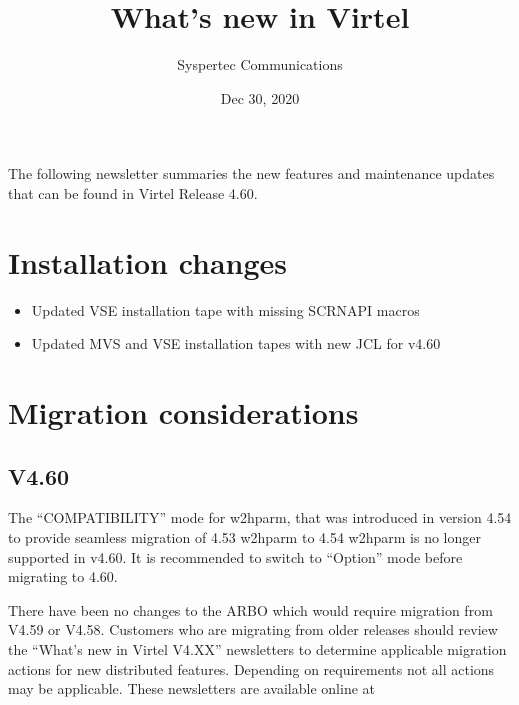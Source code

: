 \documentclass[letterpaper,10pt,english]{sphinxmanual}
\title{What's new in Virtel}
\date{Dec 30, 2020}
\author{Syspertec Communications}
\begin{document}
\pagestyle{empty}
\sphinxmaketitle
\pagestyle{plain}
\sphinxtableofcontents
\pagestyle{normal}
\label{\detokenize{TN202003::doc}}


The following newsletter summaries the new features and maintenance updates that can be found in Virtel Release 4.60.


\chapter{Installation changes}
\label{\detokenize{TN202003:installation-changes}}
\begin{itemize}
\item {} 
Updated VSE installation tape with missing SCRNAPI macros

\end{itemize}

\begin{itemize}
\item {} 
Updated MVS and VSE installation tapes with new JCL for v4.60

\end{itemize}


\chapter{Migration considerations}
\label{\detokenize{TN202003:migration-considerations}}

\section{V4.60}
\label{\detokenize{TN202003:v4-60}}

The “COMPATIBILITY” mode for w2hparm, that was introduced in version 4.54 to provide seamless migration of 4.53 w2hparm to 4.54 w2hparm is no longer supported in v4.60. It is recommended to switch to “Option” mode before migrating to 4.60.


There have been no changes to the ARBO which would require migration from V4.59 or V4.58. Customers who are migrating from older releases should review the
“What’s new in Virtel V4.XX” newsletters to determine applicable migration actions for new distributed features.
Depending on requirements not all actions may be applicable. These newsletters are available online at 
\end{document}
